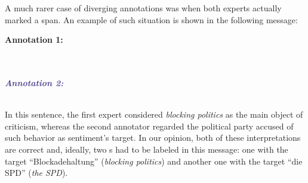 
A much rarer case of diverging  annotations was when
both experts actually marked a  span.  An example
of such situation is shown in the following message:
\begin{example}\label{snt:exmp:targt-disagr}
  \textcolor{red3}{\textbf{Annotation
      1:}}\\
  \upshape{}\\[0.5em]
  \noindent\itshape{}\\[0.6em]\itshape

  \noindent\textcolor{darkslateblue}{\textbf{\itshape Annotation
      2:}}\\
  \upshape{}\\[0.5em]
  \noindent\itshape{}
\end{example}
In this sentence, the first expert considered \emph{blocking politics}
as the main object of criticism, whereas the second annotator regarded
the political party accused of such behavior as sentiment's target.
In our opinion, both of these interpretations are correct and,
ideally, two s had to be labeled in this message:
one with the target ``Blockadehaltung'' (\emph{blocking politics}) and
another one with the target ``die SPD'' (\emph{the SPD}).


